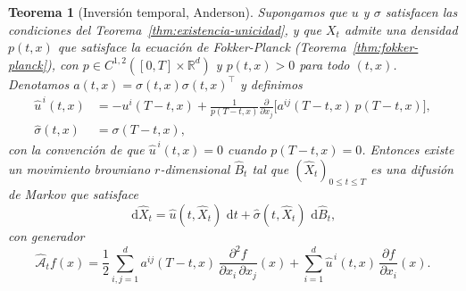 \documentclass[12pt, a4paper]{report}
\theoremstyle{plain}
\newtheorem{theorem}{Teorema}[chapter]
\theoremstyle{definition}
\theoremstyle{remark}
\newcommand{\R}{\mathbb{R}}
\newcommand{\dd}{\,\mathrm{d}}
\begin{document}
\begin{theorem}[Inversión temporal, Anderson]
\label{thm:time-reversal}
Supongamos que $u$ y $\sigma$ satisfacen las condiciones del Teorema~\ref{thm:existencia-unicidad}, y que $X_t$ admite una densidad $p(t,x)$ que satisface la ecuación de Fokker-Planck (Teorema~\ref{thm:fokker-planck}), con $p \in C^{1,2}([0,T]\times\R^d)$ y $p(t,x) > 0$ para todo $(t,x)$.
Denotamos $a(t,x) = \sigma(t,x)\sigma(t,x)^{\top}$ y definimos
\begin{align*}
  \hat{u}^{\,i}(t,x) &= -u^i(T-t,x)
    + \frac{1}{p(T-t,x)}\frac{\partial}{\partial x_j}
      \bigl[a^{ij}(T-t,x)\,p(T-t,x)\bigr], \\
  \hat{\sigma}(t,x) &= \sigma(T-t,x),
\end{align*}
con la convención de que $\hat{u}^{\,i}(t,x) = 0$ cuando $p(T-t,x) = 0$. Entonces existe un movimiento browniano $r$-dimensional $\hat{B}_t$ tal que $(\hat{X}_t)_{0 \leq t \leq T}$ es una difusión de Markov que satisface
\[
  \dd\hat{X}_t = \hat{u}(t,\hat{X}_t)\,\dd t + \hat{\sigma}(t,\hat{X}_t)\,\dd\hat{B}_t,
\]
con generador
\[
  \hat{\mathcal{A}}_t f(x)
  = \frac{1}{2}\sum_{i,j=1}^{d} a^{ij}(T-t,x)\,\frac{\partial^2 f}{\partial x_i\,\partial x_j}(x)
  + \sum_{i=1}^{d} \hat{u}^{\,i}(t,x)\,\frac{\partial f}{\partial x_i}(x).
\]
\end{theorem}
\end{document}
